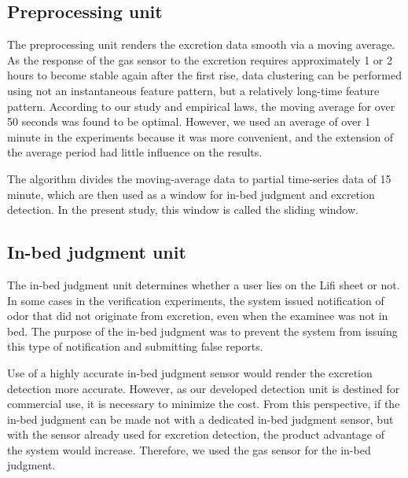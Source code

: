 \documentclass[publish,JRM,paper]{jaciiiarticle}
\begin{document}
\subsection{Preprocessing unit}
The preprocessing unit renders the excretion data smooth via a moving average. As the response of the gas sensor to the excretion requires approximately 1 or 2 hours to become stable again after the first rise, data clustering can be performed using not an instantaneous feature pattern, but a relatively long-time feature pattern. According to our study and empirical laws, the moving average for over 50 seconds was found to be optimal. However, we used an average of over 1 minute in the experiments because it was more convenient, and the extension of the average period had little influence on the results.

The algorithm divides the moving-average data to partial time-series data of 15 minute, which are then used as a window for in-bed judgment and excretion detection. In the present study, this window is called the sliding window.

\subsection{In-bed judgment unit}
The in-bed judgment unit determines whether a user lies on the Lifi sheet or not. In some cases in the verification experiments, the system issued notification of odor that did not originate from excretion, even when the examinee was not in bed. The purpose of the in-bed judgment was to prevent the system from issuing this type of notification and submitting false reports.

Use of a highly accurate in-bed judgment sensor would render the excretion detection more accurate. However, as our developed detection unit is destined for commercial use, it is necessary to minimize the cost. From this perspective, if the in-bed judgment can be made not with a dedicated in-bed judgment sensor, but with the sensor already used for excretion detection, the product advantage of the system would increase. Therefore, we used the gas sensor for the in-bed judgment.
\end{document}
